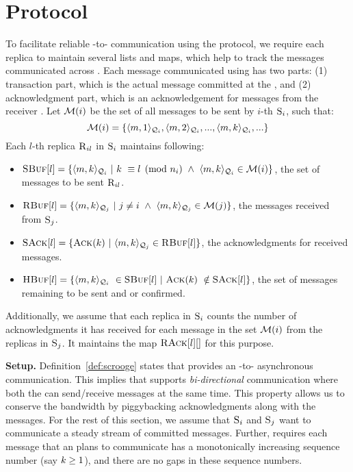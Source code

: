 \section{\Shadow{} Protocol}
To facilitate reliable \RSM{}-to-\RSM{} communication using the \Scrooge{} protocol, 
we require each replica to maintain several lists and maps, which
help to track the messages communicated across .
Each message communicated using \Scrooge{} has two parts: 
(1) transaction part, which is the actual message committed at the \RSM{}, and 
(2) acknowledgment part, which is an acknowledgement for messages from the receiver \RSM{}. 
Let $\mathcal{M}(i)$ be the set of all messages to be sent by $i$-th \RSM{} $\textsc{S}_{i}$, such that:
\begin{equation*}
\mathcal{M}(i) = \{\langle m, 1\rangle_{\mathcal{Q}_{i}},  \langle m, 2\rangle_{\mathcal{Q}_{i}}, ... , \langle m, k\rangle_{\mathcal{Q}_{i}}, ... \} 
\end{equation*}
Each $l$-th replica $\textsc{R}_{{i}{l}}$ in \RSM{} $\textsc{S}_{i}$ maintains following:

\begin{itemize}[wide]
\item $\textsc{SBuf}[{l}] = \{\langle m, k\rangle_{\mathcal{Q}_{i}} ~|~ k ~\equiv l \pmod{n_i} ~\wedge ~\langle m, k\rangle_{\mathcal{Q}_{i}} \in \mathcal{M}(i) \}$, the set of messages to be sent $\textsc{R}_{{i}{l}}$.

\item $\textsc{RBuf}[{l}] = \{\langle m, k\rangle_{\mathcal{Q}_{j}} ~|~ j \neq i ~\wedge ~\langle m, k\rangle_{\mathcal{Q}_{j}} \in \mathcal{M}(j) \}$, the messages received from \RSM{} $\textsc{S}_{j}$.

\item $\textsc{SAck}[{l}] = \{\textsc{Ack}(k) ~|~ \langle m, k\rangle_{\mathcal{Q}_{j}} \in \textsc{RBuf}[{l}] \}$, the acknowledgments for received messages.

\item $\textsc{HBuf}[{l}] = \{ \langle m, k\rangle_{\mathcal{Q}_{i}} ~\in \textsc{SBuf}[{l}] ~|~ \textsc{Ack}(k) ~\notin \textsc{SAck}[{l}] \}$, the set of messages remaining to be sent and or confirmed.

\end{itemize}
%
Additionally, we assume that each replica in \RSM{} $\textsc{S}_{i}$ 
counts the number of acknowledgments it has received for 
each message in the set $\mathcal{M}(i)$ from the replicas in \RSM{} $\textsc{S}_{j}$.
It maintains the map $\textsc{RAck}[{l}][{}]$ for this purpose. 


{\bf Setup.}
Definition~\ref{def:scrooge} states that \Scrooge{} provides an \RSM{}-to-\RSM{} asynchronous communication.
This implies that \Scrooge{} supports {\em bi-directional} communication where both the  can send/receive 
messages at the same time.
This property allows us to conserve the bandwidth by piggybacking acknowledgments along with the messages.
For the rest of this section, we assume that  $\textsc{S}_{i}$ and $\textsc{S}_{j}$ want to communicate a 
steady stream of committed messages.
Further, \Scrooge{} requires each message that an \RSM{} plans to communicate has 
a monotonically increasing sequence number (say $k \ge 1$), and there are no gaps in these sequence numbers.


